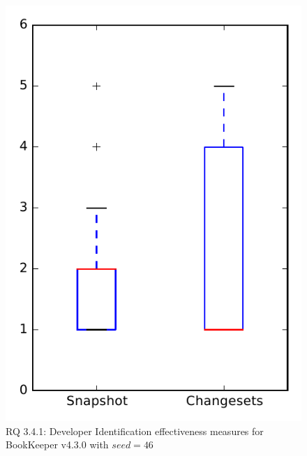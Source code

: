 
\begin{figure}
\centering
\includegraphics[height=0.4\textheight]{figures/dit_seed/rq1_bookkeeper_46}
\caption{RQ 3.4.1: Developer Identification effectiveness measures for BookKeeper v4.3.0 with $seed=46$}
\label{fig:dit_seed:rq1:bookkeeper}
\end{figure}
